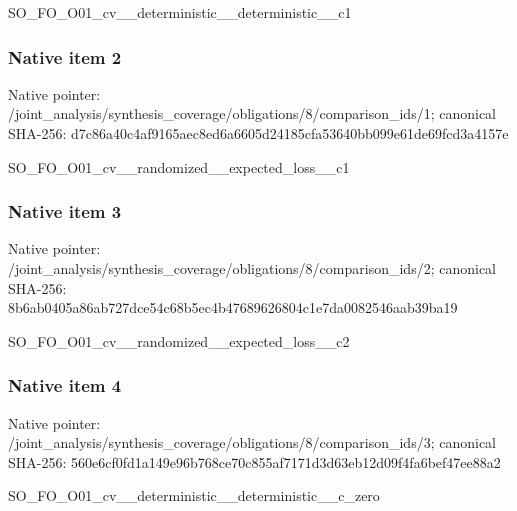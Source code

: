 \documentclass[10pt,a4paper]{article}
\begin{document}
\begingroup\raggedright\sloppy SO\_\allowbreak{}FO\_\allowbreak{}O01\_\allowbreak{}cv\_\allowbreak{}\_\allowbreak{}deterministic\_\allowbreak{}\_\allowbreak{}deterministic\_\allowbreak{}\_\allowbreak{}c1\par\endgroup

\subsubsection{Native item 2}
Native pointer: /joint\_\allowbreak{}analysis/synthesis\_\allowbreak{}coverage/obligations/8/comparison\_\allowbreak{}ids/1; canonical SHA-256: d7c86a40c4af9165aec8ed6a6605d24185cfa53640bb099e61de69fcd3a4157e

\begingroup\raggedright\sloppy SO\_\allowbreak{}FO\_\allowbreak{}O01\_\allowbreak{}cv\_\allowbreak{}\_\allowbreak{}randomized\_\allowbreak{}\_\allowbreak{}expected\_\allowbreak{}loss\_\allowbreak{}\_\allowbreak{}c1\par\endgroup

\subsubsection{Native item 3}
Native pointer: /joint\_\allowbreak{}analysis/synthesis\_\allowbreak{}coverage/obligations/8/comparison\_\allowbreak{}ids/2; canonical SHA-256: 8b6ab0405a86ab727dce54c68b5ec4b47689626804c1e7da0082546aab39ba19

\begingroup\raggedright\sloppy SO\_\allowbreak{}FO\_\allowbreak{}O01\_\allowbreak{}cv\_\allowbreak{}\_\allowbreak{}randomized\_\allowbreak{}\_\allowbreak{}expected\_\allowbreak{}loss\_\allowbreak{}\_\allowbreak{}c2\par\endgroup

\subsubsection{Native item 4}
Native pointer: /joint\_\allowbreak{}analysis/synthesis\_\allowbreak{}coverage/obligations/8/comparison\_\allowbreak{}ids/3; canonical SHA-256: 560e6cf0fd1a149e96b768ce70c855af7171d3d63eb12d09f4fa6bef47ee88a2

\begingroup\raggedright\sloppy SO\_\allowbreak{}FO\_\allowbreak{}O01\_\allowbreak{}cv\_\allowbreak{}\_\allowbreak{}deterministic\_\allowbreak{}\_\allowbreak{}deterministic\_\allowbreak{}\_\allowbreak{}c\_\allowbreak{}zero\par\endgroup
\end{document}

